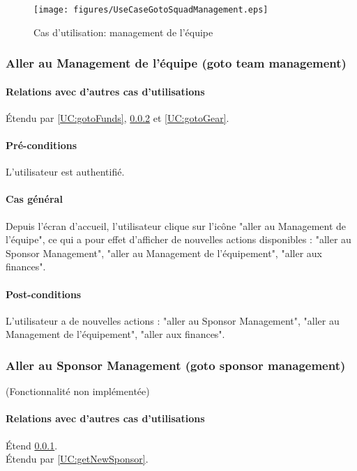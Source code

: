 \begin{figure}[h]
  \centering
  \texttt{[image: figures/UseCaseGotoSquadManagement.eps]}
   \caption{\label{fig:UC:gotoManagement} Cas d'utilisation: management de l'équipe}
\end{figure}

\subsubsection{Aller au Management de l'équipe (goto team management)}
\label{UC:gotoManagement}
\paragraph{Relations avec d'autres cas d'utilisations}
Étendu par \ref{UC:gotoFunds}, \ref{UC:gotoSponsor} et \ref{UC:gotoGear}.
\paragraph{Pré-conditions}
\begin{list}{}{\leftmargin=1.5em}
\item{L'utilisateur est authentifié.}
\end{list}
\paragraph{Cas général}
Depuis l'écran d'accueil, l'utilisateur clique sur l'icône "aller au Management de l'équipe", ce qui a pour effet d'afficher de nouvelles actions disponibles : "aller au Sponsor Management", "aller au Management de l'équipement", "aller aux finances".
\paragraph{Post-conditions}
\begin{list}{}{\leftmargin=1.5em}
\item{L'utilisateur a de nouvelles actions : "aller au Sponsor Management", "aller au Management de l'équipement", "aller aux finances".}
\end{list}

\subsubsection{Aller au Sponsor Management (goto sponsor management)}
\label{UC:gotoSponsor}
(Fonctionnalité non implémentée)
\paragraph{Relations avec d'autres cas d'utilisations}
Étend \ref{UC:gotoManagement}.\\
Étendu par \ref{UC:getNewSponsor}.
